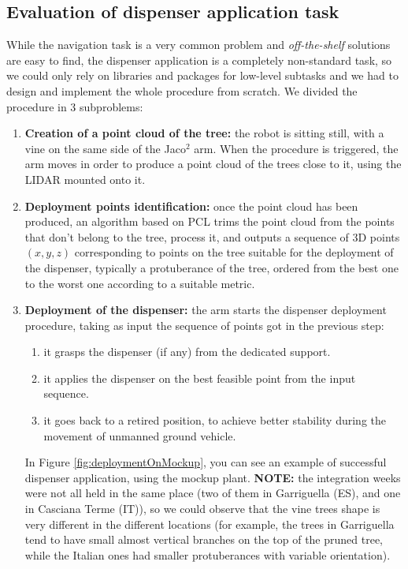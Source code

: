 \subsection{Evaluation of dispenser application task}
 While the navigation task is a very common problem and \textit{off-the-shelf} solutions are easy to find, the dispenser application is a completely non-standard task, so we could only rely on libraries and packages for low-level subtasks and we had to design and implement the whole procedure from scratch. We divided the procedure in 3 subproblems:
 \begin{enumerate}
 	\item \textbf{Creation of a point cloud of the tree:} the robot is sitting still, with a vine on the same side of the Jaco$^2$ arm. When the procedure is triggered, the arm moves in order to produce a point cloud of the trees close to it, using the \ac{LIDAR} mounted onto it. 
 	\item \textbf{Deployment points identification:} once the point cloud has been produced, an algorithm based on \ac{PCL} trims the point cloud from the points that don't belong to the tree, process it, and outputs a sequence of 3D points $(x,y,z)$ corresponding to points on the tree suitable for the deployment of the dispenser, typically a protuberance of the tree, ordered from the best one to the worst one according to a suitable metric.
 	\item \textbf{Deployment of the dispenser:} the arm starts the dispenser deployment procedure, taking as input the sequence of points got in the previous step:
 	\begin{enumerate}
 		\item it grasps the dispenser (if any) from the dedicated support.
 		\item it applies the dispenser on the best feasible point from the input sequence.
 		\item it goes back to a retired position, to achieve better stability during the movement of unmanned ground vehicle.
 	\end{enumerate}
 	In Figure \ref{fig:deploymentOnMockup}, you can see an example of successful dispenser application, using the mockup plant. \textbf{NOTE:} the integration weeks were not all held in the same place (two of them in Garriguella (ES), and one in Casciana Terme (IT)), so we could observe that the vine trees shape is very different in the different locations (for example, the trees in Garriguella tend to have small almost vertical branches on the top of the pruned tree, while the Italian ones had smaller protuberances with variable orientation). 

\end{enumerate}
